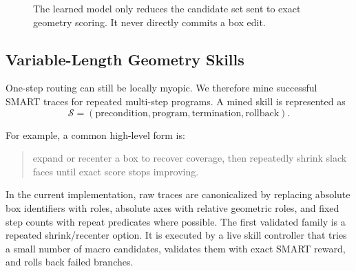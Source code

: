 \documentclass[10pt,twocolumn,letterpaper]{article}
\begin{document}
\begin{figure}[t]
\small
{}
\caption{The learned model only reduces the candidate set sent to exact
geometry scoring.  It never directly commits a box edit.}
\label{fig:router_algo}
\end{figure}

\subsection{Variable-Length Geometry Skills}

One-step routing can still be locally myopic.  We therefore mine successful
SMART traces for repeated multi-step programs.  A mined skill is represented as
\begin{equation}
  \mathcal{S} =
  (\text{precondition}, \text{program}, \text{termination}, \text{rollback}).
\end{equation}

For example, a common high-level form is:
\begin{quote}
expand or recenter a box to recover coverage, then repeatedly shrink slack
faces until exact score stops improving.
\end{quote}

In the current implementation, raw traces are canonicalized by replacing
absolute box identifiers with roles, absolute axes with relative geometric
roles, and fixed step counts with repeat predicates where possible.  The first
validated family is a repeated shrink/recenter option.  It is executed by a
live skill controller that tries a small number of macro candidates, validates
them with exact SMART reward, and rolls back failed branches.
\end{document}
